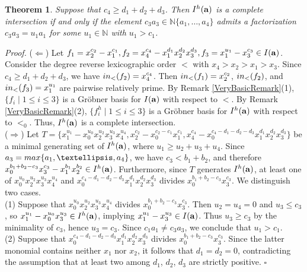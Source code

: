 \documentclass[10pt,a4paper]{amsart}
\newtheorem{thm1}{Theorem}[section]
\begin{document}
\begin{thm1} \label{basicvfff} Suppose that $c_{4} \geq d_1+d_2+d_3$. Then $I^{h}({\bf a})$ is a complete intersection if and only if the element $c_{3}a_3 \in \mathbb{N}\{a_1,\ldots,a_4\}$ admits a factorization $c_{3}a_3=u_1a_{1}$ for some $u_1 \in \mathbb{N}$ with $u_{1}>c_1$.
\end{thm1}
{\em \noindent Proof.} ($\Leftarrow$) Let $f_{1}=x_{2}^{c_2}-x_{1}^{c_1}, f_{2}=x_{4}^{c_4}-x_{1}^{d_1}x_2^{d_2}x_{3}^{d_3}, f_{3}=x_{1}^{u_1}-x_{3}^{c_3} \in I({\bf a})$. Consider the degree reverse lexicographic order $<$ with $x_4>x_2>x_1>x_3$. Since $c_{4} \geq d_1+d_2+d_3$, we have ${\rm in}_{<}(f_{2})=x_{4}^{c_4}$. Then ${\rm in}_{<}(f_{1})=x_{2}^{c_2}$, ${\rm in}_{<}(f_{2})$, and ${\rm in}_{<}(f_{3})=x_{1}^{u_1}$ are pairwise relatively prime. By Remark \ref{VeryBasicRemark}(1), $\{f_i \mid 1 \leq i \leq 3\}$ is a Gr\"obner basis for $I({\bf a})$ with respect to $<$. By Remark \ref{VeryBasicRemark}(2), $\{f_{i}^h \mid 1 \leq i \leq 3\}$ is a Gr\"obner basis for $I^{h}({\bf a})$ with respect to $<_{0}$. Thus, $I^{h}({\bf a})$ is a complete intersection.\\
($\Rightarrow$) Let $T=\{x_{1}^{u_1}-x_{0}^{u_0}x_{2}^{u_2}x_{3}^{u_3}x_{4}^{u_4}, x_{2}^{c_2}-x_{0}^{c_2-c_1}x_{1}^{c_1}, x_{4}^{c_4}-x_{0}^{c_4-d_1-d_2-d_3}x_{1}^{d_1}x_{2}^{d_2}x_{3}^{d_3}\}$ be a minimal generating set of $I^{h}({\bf a})$, where $u_{1} \geq u_2+u_3+u_4$. Since $a_{3}={\rm max}\{a_1,\ldots,a_4\}$, we have $c_{3}<b_{1}+b_{2}$, and therefore $x_{0}^{b_{1}+b_{2}-c_{3}}x_{3}^{c_3}-x_{1}^{b_1}x_{2}^{b_2} \in I^{h}({\bf a})$. Furthermore, since $T$ generates $I^{h}({\bf a})$, at least one of $x_{0}^{u_0}x_{2}^{u_2}x_{3}^{u_3}x_{4}^{u_4}$ and $x_{0}^{c_4-d_1-d_2-d_3}x_{1}^{d_1}x_{2}^{d_2}x_{3}^{d_3}$ divides $x_{0}^{b_{1}+b_{2}-c_{3}}x_{3}^{c_3}$. We distinguish two cases.\\
(1) Suppose that $x_{0}^{u_0}x_{2}^{u_2}x_{3}^{u_3}x_{4}^{u_4}$ divides $x_{0}^{b_{1}+b_{2}-c_{3}}x_{3}^{c_3}$. Then $u_{2}=u_{4}=0$ and $u_{3} \leq c_{3}$, so $x_{1}^{u_1}-x_{0}^{u_0}x_{3}^{u_3} \in I^{h}({\bf a})$, implying $x_{1}^{u_1}-x_{3}^{u_3} \in I({\bf a})$. Thus $u_{3} \geq c_{3}$ by the minimality of $c_3$, hence $u_{3}=c_{3}$. Since $c_{1}a_1 \neq c_{3}a_3$, we conclude that $u_1>c_1$.\\
(2) Suppose that $x_{0}^{c_4-d_1-d_2-d_3}x_{1}^{d_1}x_{2}^{d_2}x_{3}^{d_3}$ divides $x_{0}^{b_{1}+b_{2}-c_{3}}x_{3}^{c_3}$. Since the latter monomial contains neither $x_1$ nor $x_2$, it follows that $d_1=d_2=0$, contradicting the assumption that at least two among $d_1$, $d_2$, $d_3$ are strictly positive.  \hfill $\square$ \par\vspace{0.5\baselineskip}
\end{document}
